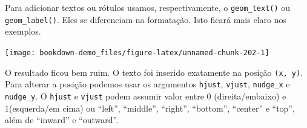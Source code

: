 \documentclass[]{book}
\newenvironment{Shaded}{\begin{snugshade}}{\end{snugshade}}
\newcommand{\KeywordTok}[1]{\textcolor[rgb]{0.13,0.29,0.53}{\textbf{#1}}}
\newcommand{\DataTypeTok}[1]{\textcolor[rgb]{0.13,0.29,0.53}{#1}}
\newcommand{\DecValTok}[1]{\textcolor[rgb]{0.00,0.00,0.81}{#1}}
\newcommand{\StringTok}[1]{\textcolor[rgb]{0.31,0.60,0.02}{#1}}
\newcommand{\OperatorTok}[1]{\textcolor[rgb]{0.81,0.36,0.00}{\textbf{#1}}}
\newcommand{\NormalTok}[1]{#1}
\begin{document}
Para adicionar textos ou rótulos usamos, respectivamente, o
\texttt{geom\_text()} ou \texttt{geom\_label()}. Eles se diferenciam na
formatação. Isto ficará mais claro nos exemplos.

\begin{Shaded}
\end{Shaded}

\begin{center}\texttt{[image: bookdown-demo\_files/figure-latex/unnamed-chunk-202-1]} \end{center}

O resultado ficou bem ruim. O texto foi inserido exatamente na posição
\texttt{(x,\ y)}. Para alterar a posição podemos usar os argumentos
\texttt{hjust}, \texttt{vjust}, \texttt{nudge\_x} e \texttt{nudge\_y}. O
\texttt{hjust} e \texttt{vjust} podem assumir valor entre 0
(direita/embaixo) e 1(esquerda/em cima) ou ``left'', ``middle'',
``right'', ``bottom'', ``center'' e ``top'', além de ``inward'' e
``outward''.
\end{document}
